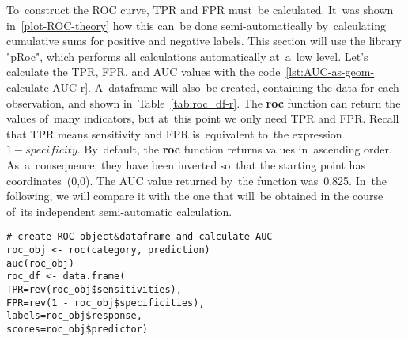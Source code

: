 \documentclass[]{scrreprt}
\begin{document}
To~construct the ROC curve, TPR and FPR must~be calculated. It~was shown in~\ref{plot-ROC-theory} how this can~be done semi-automatically by~calculating cumulative sums for positive and negative labels. This section will use the library "pRoc", which performs all calculations automatically at~a~low level. Let's calculate the TPR, FPR, and AUC values with the code~\ref{lst:AUC-as-geom-calculate-AUC-r}. A~dataframe will also~be created, containing the data for each observation, and shown in~Table~\ref{tab:roc_df-r}. The \textbf{roc} function can return the values of~many indicators, but at~this point we only need TPR and FPR. Recall that TPR means sensitivity and FPR is~equivalent to~the expression $1 - specificity$. By~default, the \textbf{roc} function returns values in~ascending order. As~a~consequence, they have been inverted so~that the starting point has coordinates~(0,0). The AUC value returned by~the function was~0.825. In~the following, we will compare it with the one that will~be obtained in the course of~its independent semi-automatic calculation.
%
\begin{lstlisting}[float=htp, caption = Calculation of~the AUC using the pRoc library, firstnumber=1, label= lst:AUC-as-geom-calculate-AUC-r]
# create ROC object&dataframe and calculate AUC
roc_obj <- roc(category, prediction)
auc(roc_obj)
roc_df <- data.frame(
TPR=rev(roc_obj$sensitivities), 
FPR=rev(1 - roc_obj$specificities), 
labels=roc_obj$response, 
scores=roc_obj$predictor)
\end{lstlisting}
%
\end{document}
